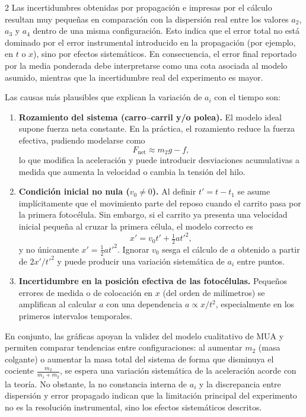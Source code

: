 \documentclass[12pt,a4paper]{article}
\begin{document}
\begin{multicols}{2}
\bigskip
Las incertidumbres obtenidas por propagación e impresas por el cálculo resultan muy pequeñas en comparación con la dispersión real entre los valores $a_2$, $a_3$ y $a_4$ dentro de una misma configuración. Esto indica que el error total no está dominado por el error instrumental introducido en la propagación (por ejemplo, en $t$ o $x$), sino por efectos sistemáticos. En consecuencia, el error final reportado por la media ponderada debe interpretarse como una cota asociada al modelo asumido, mientras que la incertidumbre real del experimento es mayor.

\bigskip
Las causas más plausibles que explican la variación de $a_i$ con el tiempo son:

\begin{enumerate}
\item \textbf{Rozamiento del sistema (carro--carril y/o polea).} El modelo ideal supone fuerza neta constante. En la práctica, el rozamiento reduce la fuerza efectiva, pudiendo modelarse como
\begin{equation}
F_{\text{net}} \approx m_2 g - f,
\end{equation}
lo que modifica la aceleración y puede introducir desviaciones acumulativas a medida que aumenta la velocidad o cambia la tensión del hilo.

\item \textbf{Condición inicial no nula ($v_0\neq 0$).} Al definir $t' = t - t_1$ se asume implícitamente que el movimiento parte del reposo cuando el carrito pasa por la primera fotocélula. Sin embargo, si el carrito ya presenta una velocidad inicial pequeña al cruzar la primera célula, el modelo correcto es
\begin{equation}
x' = v_0 t' + \tfrac{1}{2} a t'^2,
\end{equation}
y no únicamente $x'=\tfrac{1}{2}at'^2$. Ignorar $v_0$ sesga el cálculo de $a$ obtenido a partir de $2x'/t'^2$ y puede producir una variación sistemática de $a_i$ entre puntos.

\item \textbf{Incertidumbre en la posición efectiva de las fotocélulas.} Pequeños errores de medida o de colocación en $x$ (del orden de milímetros) se amplifican al calcular $a$ con una dependencia $a\propto x/t^2$, especialmente en los primeros intervalos temporales.
\end{enumerate}

\bigskip
En conjunto, las gráficas apoyan la validez del modelo cualitativo de MUA y permiten comparar tendencias entre configuraciones: al aumentar $m_2$ (masa colgante) o aumentar la masa total del sistema de forma que disminuya el cociente $\frac{m_2}{m_1+m_2}$, se espera una variación sistemática de la aceleración acorde con la teoría. No obstante, la no constancia interna de $a_i$ y la discrepancia entre dispersión y error propagado indican que la limitación principal del experimento no es la resolución instrumental, sino los efectos sistemáticos descritos.


\end{multicols}
\end{document}
